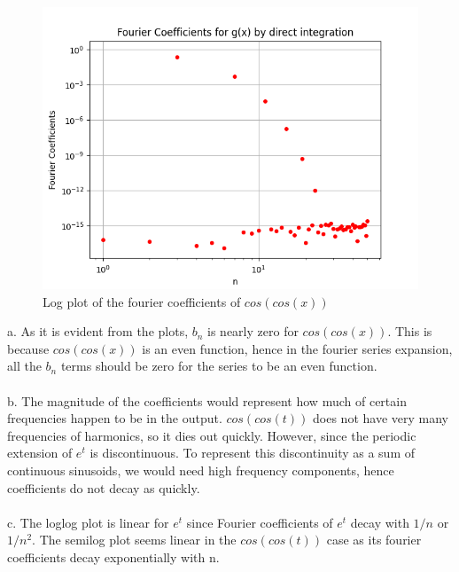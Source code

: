 \documentclass[11pt, a4paper]{article}
\begin{document}
	\begin{figure}[!tbh]
   	\centering
   	\includegraphics[scale=0.6]{Figure7.png}   
   	\caption{Log plot of the fourier coefficients of $cos(cos(x))$}
   	\label{fig:sample}
   \end{figure} 

a. As it is evident from the plots, $b_n$ is nearly zero for $cos(cos(x))$. This is because $cos(cos(x))$ is an even function, hence in the fourier series expansion, all the $b_n$ terms should be zero for the series to be an even function.\\\\
b. The magnitude of the coefficients would represent how much of certain frequencies happen to be in the output. $cos(cos(t))$ does not have very many frequencies of harmonics, so it dies out quickly. However, since the periodic extension of $e^{t}$ is discontinuous. To represent this discontinuity as a sum of continuous sinusoids, we would need high frequency components, hence coefficients do not decay as quickly.\\\\
c. The loglog plot is linear for $e^{t}$ since Fourier coefficients of $e^{t}$ decay with $1/n$ or $1/n^{2}$. The semilog plot seems linear in the $cos(cos(t))$ case as its fourier coefficients decay exponentially with n.
\end{document}
